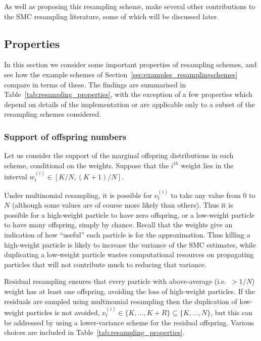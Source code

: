 As well as proposing this resampling scheme, \textcite{gerber2017} make several other contributions to the SMC resampling literature, some of which will be discussed later.






\subsection{Properties}\label{sec:resampling_properties}
In this section we consider some important properties of resampling schemes, and see how the example schemes of Section~\ref{sec:examples_resamplingschemes} compare in terms of these.
The findings are summarised in Table~\ref{tab:resampling_properties}, with the exception of a few properties which depend on details of the implementation or are applicable only to a subset of the resampling schemes considered.


\subsubsection{Support of offspring numbers}
Let us consider the support of the marginal offspring distributions in each scheme, conditional on the weights. Suppose that the $i^{th}$ weight lies in the interval $w_t^{(i)} \in [K/N, (K+1)/N]$.

Under multinomial resampling, it is possible for $\nu_t^{(i)}$ to take any value from $0$ to $N$ (although some values are of course more likely than others).
Thus it is possible for a high-weight particle to have zero offspring, or a low-weight particle to have many offspring, simply by chance.
Recall that the weights give an indication of how ``useful'' each particle is for the approximation. Thus killing a high-weight particle is likely to increase the variance of the SMC estimates, while duplicating a low-weight particle wastes computational resources on propagating particles that will not contribute much to reducing that variance.

Residual resampling ensures that every particle with above-average (i.e.\ $>1/N$) weight has at least one offspring, avoiding the loss of high-weight particles. If the residuals are sampled using multinomial resampling then the duplication of low-weight particles is not avoided, $\nu_t^{(i)} \in \{K, \dots, K+R\} \subseteq \{K,\dots, N\}$, but this can be addressed by using a lower-variance scheme for the residual offspring. Various choices are included in Table~\ref{tab:resampling_properties}.

